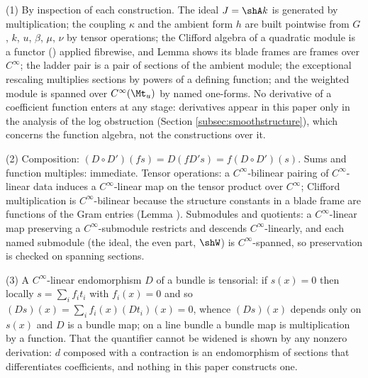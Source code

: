 (1) By inspection of each construction. The ideal $J = \shA k$ is generated by multiplication; the coupling $\kappa$ and the ambient form $h$ are built pointwise from $G$, $k$, $u$, $\beta$, $\mu$, $\nu$ by tensor operations; the Clifford algebra of a quadratic module is a functor () applied fibrewise, and Lemma  shows its blade frames are frames over $C^\infty$; the ladder pair is a pair of sections of the ambient module; the exceptional rescaling multiplies sections by powers of a defining function; and the weighted module is spanned over $C^\infty(\Mt_u)$ by named one-forms. No derivative of a coefficient function enters at any stage: derivatives appear in this paper only in the analysis of the log obstruction (Section \ref{subsec:smoothstructure}), which concerns the function algebra, not the constructions over it.

(2) Composition: $(D \circ D')(fs) = D(fD's) = f(D \circ D')(s)$. Sums and function multiples: immediate. Tensor operations: a $C^\infty$-bilinear pairing of $C^\infty$-linear data induces a $C^\infty$-linear map on the tensor product over $C^\infty$; Clifford multiplication is $C^\infty$-bilinear because the structure constants in a blade frame are functions of the Gram entries (Lemma ). Submodules and quotients: a $C^\infty$-linear map preserving a $C^\infty$-submodule restricts and descends $C^\infty$-linearly, and each named submodule (the ideal, the even part, $\shW$) is $C^\infty$-spanned, so preservation is checked on spanning sections.

(3) A $C^\infty$-linear endomorphism $D$ of a bundle is tensorial: if $s(x) = 0$ then locally $s = \sum_i f_i t_i$ with $f_i(x) = 0$ and so $(Ds)(x) = \sum_i f_i(x)(Dt_i)(x) = 0$, whence $(Ds)(x)$ depends only on $s(x)$ and $D$ is a bundle map; on a line bundle a bundle map is multiplication by a function. That the quantifier cannot be widened is shown by any nonzero derivation: $d$ composed with a contraction is an endomorphism of sections that differentiates coefficients, and nothing in this paper constructs one.
